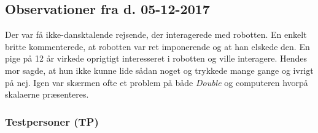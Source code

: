 \subsection{Observationer fra d. 05-12-2017}
Der var få ikke-dansktalende rejsende, der interagerede med robotten. En enkelt britte kommenterede, at robotten var ret imponerende og at han elskede den. En pige på 12 år virkede oprigtigt interesseret i robotten og ville interagere. Hendes mor sagde, at hun ikke kunne lide sådan noget og trykkede mange gange og ivrigt på nej. Igen var skærmen ofte et problem på både \textit{Double} og computeren hvorpå skalaerne præsenteres.

\subsubsection{Testpersoner (TP)}
